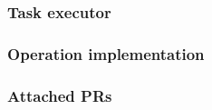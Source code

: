 \documentclass[../main.tex]{subfiles}
\begin{document}
\subsubsection*{Task executor}
\label{subsubsec:task-executor}


\subsubsection*{Operation implementation}


\subsubsection*{Attached PRs}

\end{document}
